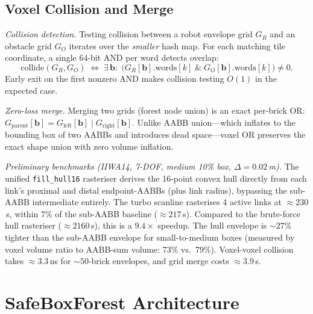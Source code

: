 \documentclass[journal]{IEEEtran}
\begin{document}
\subsection{Voxel Collision and Merge}\label{sec:voxel_ops}

\emph{Collision detection.}
Testing collision between a robot envelope grid $G_R$ and an obstacle
grid $G_O$ iterates over the \emph{smaller} hash map.
For each matching tile coordinate, a single 64-bit AND per word
detects overlap:
\begin{equation}
  \text{collide}(G_R, G_O) \;\Leftrightarrow\;
  \exists\, \bm{b}:\;
  \bigl(G_R[\bm{b}].\mathrm{words}[k]
  \;\mathbin{\&}\; G_O[\bm{b}].\mathrm{words}[k]\bigr) \ne 0.
\end{equation}
Early exit on the first nonzero AND makes collision testing
$O(1)$ in the expected case.

\emph{Zero-loss merge.}
Merging two grids (forest node union) is an exact per-brick OR:
$G_{\text{parent}}[\bm{b}] = G_{\text{left}}[\bm{b}] \mathbin{|} G_{\text{right}}[\bm{b}]$.
Unlike AABB union---which inflates to the bounding box of two AABBs
and introduces dead space---voxel OR preserves the exact shape union
with zero volume inflation.

\emph{Preliminary benchmarks (IIWA14, 7-DOF, medium 10\% box,
$\Delta{=}0.02$\,m).}
The unified \texttt{fill\_hull16} rasteriser derives the 16-point
convex hull directly from each link's proximal and distal
endpoint-AABBs (plus link radius), bypassing the sub-AABB
intermediate entirely.
The turbo scanline rasterises 4 active links at
$\approx\!230$\,\textmu s, within 7\% of the sub-AABB baseline
($\approx\!217$\,\textmu s).
Compared to the brute-force hull rasteriser ($\approx\!2160$\,\textmu s),
this is a $9.4{\times}$ speedup.
The hull envelope is $\sim\!27\%$ tighter than the sub-AABB
envelope for small-to-medium boxes (measured by voxel volume ratio
to AABB-sum volume: 73\% vs.\ 79\%).
Voxel-voxel collision takes $\approx\!3.3$\,ns for $\sim\!50$-brick
envelopes, and grid merge costs $\approx\!3.9$\,\textmu s.

\section{SafeBoxForest Architecture}\label{sec:sbf}

\end{document}
